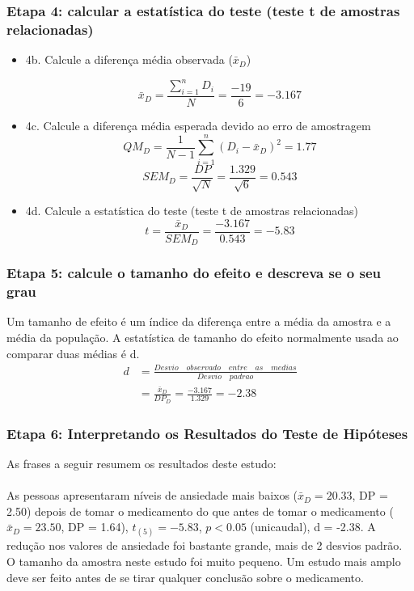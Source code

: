\documentclass[11pt]{beamer}
\begin{document}
\begin{frame}
\frametitle{Etapa 4: calcular a estatística do teste (teste t de amostras relacionadas)}
\begin{itemize}
\item 4b. Calcule a diferença média observada ($\bar{x}_D$)

\[\bar{x}_D = \frac{\sum_{i=1}^n D_i}{N} = \frac{-19}{6} = -3.167\]

\item 4c. Calcule a diferença média esperada devido ao erro de amostragem
\[QM_D = \frac{1}{N-1}\sum_{i=1}^n(D_i - \bar{x}_D)^2 = 1.77\]
\[SEM_D = \frac{DP}{\sqrt{N}} = \frac{1.329}{\sqrt{6}} = 0.543\]
\item 4d. Calcule a estatística do teste (teste t de amostras relacionadas)
\[t =  \frac{\bar{x}_D}{SEM_D}  = \frac{-3.167}{0.543} = -5.83\]
\end{itemize}
\end{frame}

\begin{frame}
\frametitle{Etapa 5: calcule o tamanho do efeito e descreva se o seu grau}
Um tamanho de efeito é um índice da diferença entre a média da amostra e a média da população. A estatística de tamanho do efeito normalmente usada ao comparar duas médias é d. 
\begin{align*}
d &= \frac{Desvio\quad observado\quad entre\quad as\quad medias}{Desvio\quad padrao}\\
  &= \frac{\bar{x}_D}{DP_D} = \frac{-3.167}{1.329} =  -2.38
\end{align*}

\end{frame}


\begin{frame}
\frametitle{Etapa 6: Interpretando os Resultados do Teste de Hipóteses}

As frases a seguir resumem os resultados deste estudo:\\~\\

As pessoas apresentaram níveis de ansiedade mais baixos (\(\bar{x}_D = 20.33\), DP = 2.50) depois de tomar o medicamento do que antes de tomar o medicamento (\(\bar{x}_D = 23.50\), DP = 1.64), \(t_{(5)} = -5.83\), \(p < 0.05\) (unicaudal), d = -2.38. A redução nos valores de ansiedade foi bastante grande, mais de 2 desvios padrão. O tamanho da amostra neste estudo foi muito pequeno. Um estudo mais amplo deve ser feito antes de se tirar qualquer conclusão sobre o medicamento.

\end{frame}
\end{document}
